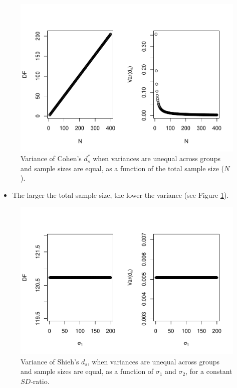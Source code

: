 \documentclass[
  english,
  man,mask]{apa6}
\providecommand{\tightlist}{%
  \setlength{\itemsep}{0pt}\setlength{\parskip}{0pt}}
\begin{document}
\begin{figure}
\centering
\includegraphics{Theoretical-Variance-of-all-estimators-as-a-function-of-population-parameters_files/figure-latex/varshiehhetbalNsize2-1.pdf}
\caption{\label{fig:varshiehhetbalNsize2}Variance of Cohen's \(d^*_s\) when variances are unequal across groups and sample sizes are equal, as a function of the total sample size (\(N\)).}
\end{figure}

\begin{itemize}
\tightlist
\item
  The larger the total sample size, the lower the variance (see Figure \ref{fig:varshiehhetbalNsize2}).
\end{itemize}

\begin{figure}
\centering
\includegraphics{Theoretical-Variance-of-all-estimators-as-a-function-of-population-parameters_files/figure-latex/varshiehhetbalvariance2-1.pdf}
\caption{\label{fig:varshiehhetbalvariance2}Variance of Shieh's \(d_s\), when variances are unequal across groups and sample sizes are equal, as a function of \(\sigma_1\) and \(\sigma_2\), for a constant \(SD\)-ratio.}
\end{figure}
\end{document}
